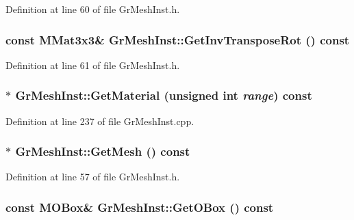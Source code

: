 Definition at line 60 of file GrMeshInst.h.\hypertarget{class_gr_mesh_inst_ffeb25d628443c633d75de24cc236355}{
\subsubsection[{GetInvTransposeRot}]{\setlength{\rightskip}{0pt plus 5cm}const {\bf MMat3x3}\& GrMeshInst::GetInvTransposeRot () const}}
\label{class_gr_mesh_inst_ffeb25d628443c633d75de24cc236355}




Definition at line 61 of file GrMeshInst.h.\hypertarget{class_gr_mesh_inst_b9f9406eba85a291edbbe2e9bf0a07bd}{
\subsubsection[{GetMaterial}]{ $\ast$ GrMeshInst::GetMaterial (unsigned int {\em range}) const}}
\label{class_gr_mesh_inst_b9f9406eba85a291edbbe2e9bf0a07bd}




Definition at line 237 of file GrMeshInst.cpp.\hypertarget{class_gr_mesh_inst_afe9b877585d9b86d1f464595b65e91c}{
\subsubsection[{GetMesh}]{$\ast$ GrMeshInst::GetMesh () const}}
\label{class_gr_mesh_inst_afe9b877585d9b86d1f464595b65e91c}




Definition at line 57 of file GrMeshInst.h.\hypertarget{class_gr_mesh_inst_c73cc039d7f4221dfb637efce6431d3e}{
\subsubsection[{GetOBox}]{\setlength{\rightskip}{0pt plus 5cm}const {\bf MOBox}\& GrMeshInst::GetOBox () const}}
\label{class_gr_mesh_inst_c73cc039d7f4221dfb637efce6431d3e}




